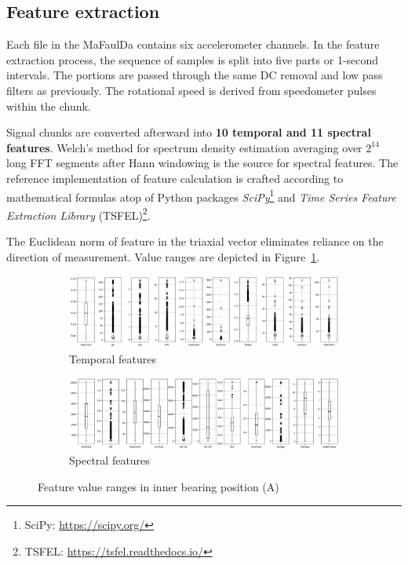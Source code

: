 \subsection{Feature extraction}
Each file in the MaFaulDa contains six accelerometer channels. In the feature extraction process, the sequence of samples is split into five parts or 1-second intervals. The portions are passed through the same DC removal and low pass filters as previously. The rotational speed is derived from speedometer pulses within the chunk.

Signal chunks are converted afterward into \textbf{10 temporal and 11 spectral features}. Welch's method for spectrum density estimation averaging over $2^{14}$ long FFT segments after Hann windowing is the source for spectral features. The reference implementation of feature calculation is crafted according to mathematical formulas atop of Python packages \emph{SciPy}\footnote{SciPy: \url{https://scipy.org/}} and \emph{Time Series Feature Extraction Library} (TSFEL)\footnote{TSFEL: \url{https://tsfel.readthedocs.io/}}.

The Euclidean norm of feature in the triaxial vector eliminates reliance on the direction of measurement. Value ranges are depicted in Figure~\ref{fig:design:feature-range}. 


\begin{figure}[ht]
    \centering
    \begin{subfigure}[b]{\textwidth}
        \includegraphics[width=\textwidth]{assets/design/feature-range-temporal.png}
        \caption{Temporal features}
    \end{subfigure}
    \hfill
    \begin{subfigure}[b]{\textwidth}
        \includegraphics[width=\textwidth]{assets/design/feature-range-spectral.png}
        \caption{Spectral features}
    \end{subfigure}
    \caption{Feature value ranges in inner bearing position (A)}
    \label{fig:design:feature-range}
\end{figure}

